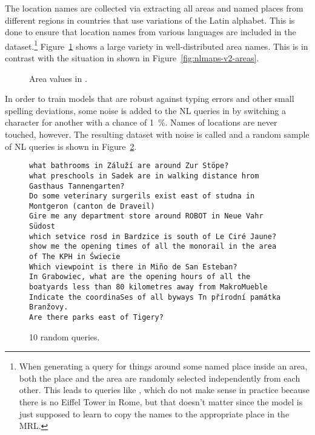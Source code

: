 The location names are collected via extracting all areas and named places from
different regions in countries that use variations of the Latin alphabet. This
is done to ensure that location names from various languages are included in the
dataset.\footnote{When generating a query for things around some named place
  inside an area, both the place and the area are randomly selected
  independently from each other. This leads to queries like , which do not make sense in practice because there is
  no Eiffel Tower in Rome, but that doesn’t matter since the model is just
  supposed to learn to copy the names to the appropriate place in the MRL.}
Figure~\ref{fig:nlmaps-v3a-areas} shows a large variety in
well-distributed area names. This is in contrast with the situation in
\nlmapstwo{} shown in Figure~\ref{fig:nlmaps-v2-areas}.

\begin{figure}[h]
  \centering
  \resizebox{\textwidth}{!}{}
  \caption[Area names in \nlmapsthreea{}]{Area values in \nlmapsthreea{}.}
  \label{fig:nlmaps-v3a-areas}
\end{figure}

In order to train models that are robust against typing errors and other small
spelling deviations, some noise is added to the NL queries in
\nlmapsthreea{} by switching a character for another with a chance of
\SI{1}{\%}. Names of locations are never touched, however. The resulting dataset
with noise is called \nlmapsthreeb{} and a random sample of NL queries is
shown in Figure~\ref{fig:nlmaps-v3b-sample}.

\begin{figure}[h]
  \centering
\begin{lstlisting}[style=MyNL]
what bathrooms in Záluží are around Zur Stöpe?
what preschools in Sadek are in walking distance hrom Gasthaus Tannengarten?
Do some veterinary surgerils exist east of studna in Montgeron (canton de Draveil)
Gire me any department store around ROBOT in Neue Vahr Südost
which setvice rosd in Bardzice is south of Le Ciré Jaune?
show me the opening times of all the monorail in the area of The KPH in Świecie
Which viewpoint is there in Miño de San Esteban?
In Grabowiec, what are the opening hours of all the boatyards less than 80 kilometres away from MakroMueble
Indicate the coordinaSes of all byways Tn přírodní památka Branžovy.
Are there parks east of Tigery?
\end{lstlisting}
  \caption[10 random \nlmapsthreeb{} queries]{10 random \nlmapsthreeb{} queries.}
  \label{fig:nlmaps-v3b-sample}
\end{figure}

